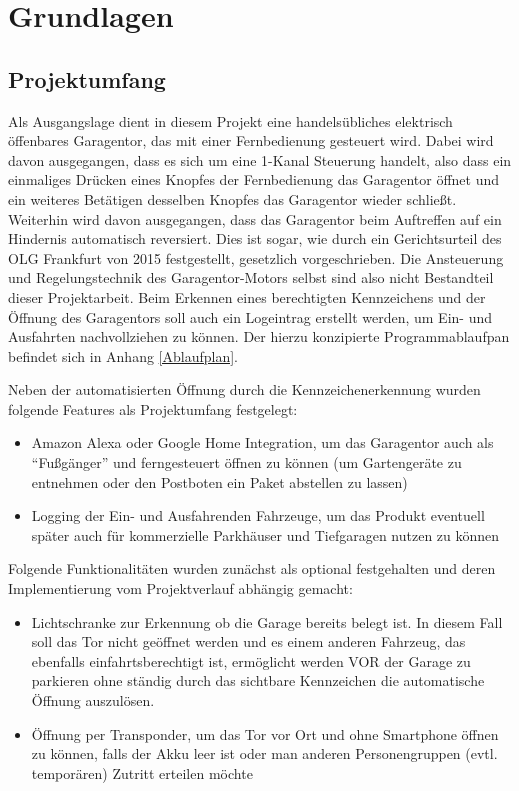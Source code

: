 \chapter{Grundlagen}
\section{Projektumfang}
Als Ausgangslage dient in diesem Projekt eine handelsübliches elektrisch öffenbares Garagentor, das mit einer Fernbedienung gesteuert wird. Dabei wird davon ausgegangen, dass es sich um eine 1-Kanal Steuerung handelt, also dass ein einmaliges Drücken eines Knopfes der Fernbedienung das Garagentor öffnet und ein weiteres Betätigen desselben Knopfes das Garagentor wieder schließt. Weiterhin wird davon ausgegangen, dass das Garagentor beim Auftreffen auf ein Hindernis automatisch reversiert. Dies ist sogar, wie durch ein Gerichtsurteil des OLG Frankfurt von 2015 festgestellt, gesetzlich vorgeschrieben.\autocite[Vgl.][]{olgfrankfurt}
Die Ansteuerung und Regelungstechnik des Garagentor-Motors selbst sind also nicht Bestandteil dieser Projektarbeit.
Beim Erkennen eines berechtigten Kennzeichens und der Öffnung des Garagentors soll auch ein Logeintrag erstellt werden, um Ein- und Ausfahrten nachvollziehen zu können. Der hierzu konzipierte Programmablaufpan befindet sich in Anhang \ref{Ablaufplan}.

Neben der automatisierten Öffnung durch die Kennzeichenerkennung wurden folgende Features als Projektumfang festgelegt:

\begin{itemize}
\item Amazon Alexa oder Google Home Integration, um das Garagentor auch als \enquote{Fußgänger} und ferngesteuert öffnen zu können (um Gartengeräte zu entnehmen oder den Postboten ein Paket abstellen zu lassen)




\item Logging der Ein- und Ausfahrenden Fahrzeuge, um das Produkt eventuell später auch für kommerzielle Parkhäuser und Tiefgaragen nutzen zu können
\end{itemize}
Folgende Funktionalitäten wurden zunächst als optional festgehalten und deren Implementierung vom Projektverlauf abhängig gemacht:
\begin{itemize}
\item Lichtschranke zur Erkennung ob die Garage bereits belegt ist. In diesem Fall soll das Tor nicht geöffnet werden und es einem anderen Fahrzeug, das ebenfalls einfahrtsberechtigt ist, ermöglicht werden VOR der Garage zu parkieren ohne ständig durch das sichtbare Kennzeichen die automatische Öffnung auszulösen.

\item Öffnung per Transponder, um das Tor vor Ort und ohne Smartphone öffnen zu können, falls der Akku leer ist oder man anderen Personengruppen (evtl. temporären) Zutritt erteilen möchte


\end{itemize}

